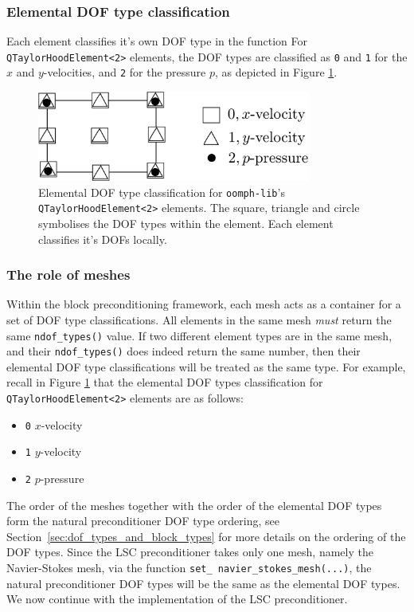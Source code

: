 \subsubsection{Elemental DOF type classification}
Each element classifies it's own DOF type in the function 
For \texttt{Q\allowbreak TaylorHood\allowbreak Element<2>} 
elements, the DOF types are classified as \texttt{0} and \texttt{1} for the $x$
and $y$-velocities, and \texttt{2} for the pressure $p$, as depicted in Figure \ref{fig:2DTH_DOF_classification_v1}.
\begin{figure}[H]
\centering
\includegraphics[width=0.8\textwidth]{./pic/taylorhood_dof_classification.pdf}
\caption{Elemental DOF type classification for \texttt{oomph-\allowbreak lib}'s
  \texttt{Q\allowbreak TaylorHood\allowbreak Element<2>} elements. The square,
  triangle and circle symbolises the DOF types within the element. Each element
  classifies it's DOFs locally.}
\label{fig:2DTH_DOF_classification_v1}
\end{figure}

\subsubsection{The role of meshes}
Within the block preconditioning framework, each mesh acts as a container for 
a set of DOF type classifications. All elements in the same mesh \emph{must} 
return the same \texttt{ndof\_\allowbreak types()} value. If two different 
element types are in the same mesh, and their \texttt{ndof\_\allowbreak types()}
does indeed return the same number, then their elemental DOF type 
classifications will be treated as the same type. For example, recall in 
Figure \ref{fig:2DTH_DOF_classification_v1} that the elemental DOF types 
classification for \texttt{Q\allowbreak TaylorHood\allowbreak Element<2>} 
elements are as follows:
\begin{itemize}
  \item \texttt{0} $x$-velocity
  \item \texttt{1} $y$-velocity
  \item \texttt{2} $p$-pressure
\end{itemize}
The order of the meshes together with the order of the elemental DOF types form
the natural preconditioner DOF type ordering, see
Section~\ref{sec:dof_types_and_block_types} for more details on the ordering of
the DOF types.  Since the LSC preconditioner takes only one mesh, namely the
Navier-Stokes mesh, via the function \texttt{set\_\allowbreak
  navier\_\allowbreak stokes\_\allowbreak mesh(...)}, the natural
preconditioner DOF types will be the same as the elemental DOF types.
We now continue with the implementation of the LSC preconditioner.



